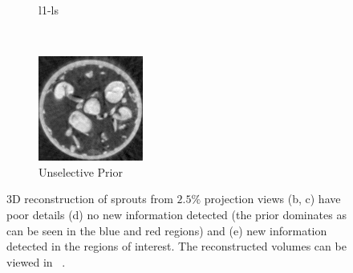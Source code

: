 \documentclass[journal]{IEEEtran}
\begin{document}
\begin{figure}[!h]
\begin{subfigure}[b]{0.3\linewidth}
        \caption{l1-ls}
     \end{subfigure}\\
\quad
    \begin{subfigure}[b]{0.3\linewidth}
        \includegraphics[width=\textwidth]{../images/sprouts/plainPriorIm.png}
        \caption{Unselective Prior}
     \end{subfigure}
     \caption{3D reconstruction of sprouts from $2.5\%$ projection views
   (b, c) have poor details (d) no new information detected (the
   prior dominates as can be seen in the blue and red regions) and
   (e) new information detected in the regions of interest. The reconstructed volumes can be viewed in ~\cite{supp_paper}.} 
\label{fig:sprouts_3D_results}
\end{figure}
\end{document}
